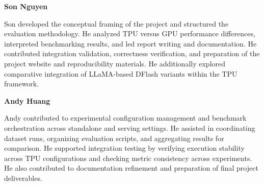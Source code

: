 \documentclass[12pt,letterpaper]{article}
\begin{document}
\medskip

\textbf{Son Nguyen}

Son developed the conceptual framing of the project and structured the evaluation methodology. He analyzed TPU versus GPU performance differences, interpreted benchmarking results, and led report writing and documentation. He contributed integration validation, correctness verification, and preparation of the project website and reproducibility materials. He additionally explored comparative integration of LLaMA-based DFlash variants within the TPU framework.

\medskip

\textbf{Andy Huang}

Andy contributed to experimental configuration management and benchmark orchestration across standalone and serving settings. He assisted in coordinating dataset runs, organizing evaluation scripts, and aggregating results for comparison. He supported integration testing by verifying execution stability across TPU configurations and checking metric consistency across experiments. He also contributed to documentation refinement and preparation of final project deliverables.
\end{document}
